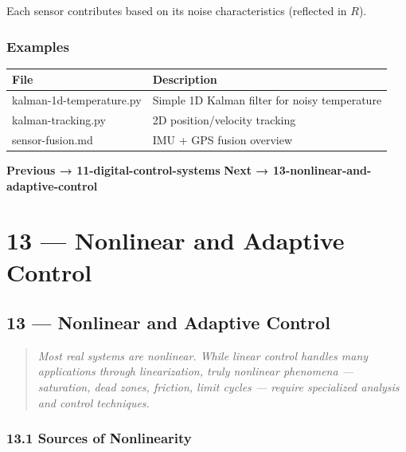 \documentclass[11pt,a4paper]{book}
\begin{document}
\begin{itemize}
Each sensor contributes based on its noise characteristics (reflected in $R$).

\medskip\noindent\hrulefill\medskip

\subsection{Examples}

\begin{center}
\begin{tabular}{|l|l|}
\hline
File & Description \\
\hline
kalman-1d-temperature.py & Simple 1D Kalman filter for noisy temperature \\
kalman-tracking.py & 2D position/velocity tracking \\
sensor-fusion.md & IMU + GPS fusion overview \\
\hline
\end{tabular}
\end{center}

\medskip\noindent\hrulefill\medskip

\textbf{Previous → 11-digital-control-systems}  
\textbf{Next → 13-nonlinear-and-adaptive-control}


\chapter{13 — Nonlinear and Adaptive Control}
\section{13 — Nonlinear and Adaptive Control}

\begin{quote}
\textit{Most real systems are nonlinear. While linear control handles many applications through linearization, truly nonlinear phenomena — saturation, dead zones, friction, limit cycles — require specialized analysis and control techniques.}
\end{quote}

\medskip\noindent\hrulefill\medskip

\subsection{13.1 Sources of Nonlinearity}


\end{itemize}
\end{document}

